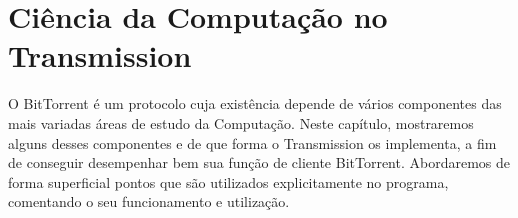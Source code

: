 
\chapter{Ciência da Computação no Transmission}
\label{cap:bcctransmission}

O BitTorrent é um protocolo cuja existência depende de vários componentes das mais
variadas áreas de estudo da Computação. Neste capítulo, mostraremos alguns desses
componentes e de que forma o Transmission os implementa, a fim de conseguir desempenhar
bem sua função de cliente BitTorrent. Abordaremos de forma superficial pontos que são
utilizados explicitamente no programa, comentando o seu funcionamento e utilização.
















\afterpage{\clearpage}